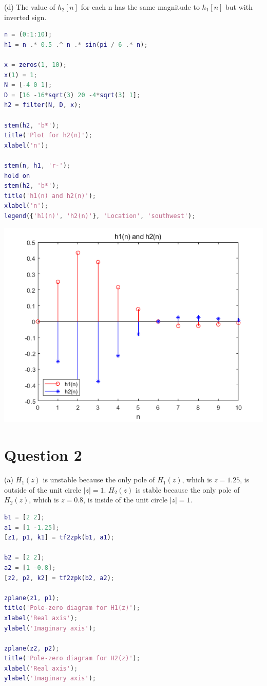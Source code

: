 \documentclass{article}
\begin{document}
(d) The value of $h_2[n]$ for each n has the same magnitude to $h_1[n]$ but with inverted sign.
\begin{lstlisting}[language=Matlab]
n = (0:1:10);
h1 = n .* 0.5 .^ n .* sin(pi / 6 .* n);

x = zeros(1, 10);
x(1) = 1;
N = [-4 0 1];
D = [16 -16*sqrt(3) 20 -4*sqrt(3) 1];
h2 = filter(N, D, x);

stem(h2, 'b*');
title('Plot for h2(n)');
xlabel('n');

stem(n, h1, 'r-');
hold on
stem(h2, 'b*');
title('h1(n) and h2(n)');
xlabel('n');
legend({'h1(n)', 'h2(n)'}, 'Location', 'southwest');
\end{lstlisting}

\includegraphics[width=\textwidth]{QuestionOneD.png}

\section*{Question 2}
(a) $H_1(z)$ is unstable because the only pole of $H_1(z)$, which is $z=1.25$, is outside of the unit circle $|z|=1$. $H_2(z)$ is stable because the only pole of $H_2(z)$, which is $z=0.8$, is inside of the unit circle $|z|=1$.

\begin{lstlisting}[language=Matlab]
b1 = [2 2];
a1 = [1 -1.25];
[z1, p1, k1] = tf2zpk(b1, a1);

b2 = [2 2];
a2 = [1 -0.8];
[z2, p2, k2] = tf2zpk(b2, a2);

zplane(z1, p1);
title('Pole-zero diagram for H1(z)');
xlabel('Real axis');
ylabel('Imaginary axis');

zplane(z2, p2);
title('Pole-zero diagram for H2(z)');
xlabel('Real axis');
ylabel('Imaginary axis');
\end{lstlisting}
\end{document}
